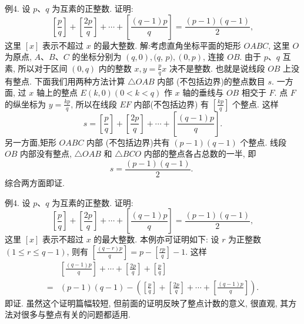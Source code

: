 例4. 设 $p 、 q$ 为互素的正整数.
证明:
$$
\left[\frac{p}{q}\right]+\left[\frac{2 p}{q}\right]+\cdots+\left[\frac{(q-1) p}{q}\right]=\frac{(p-1)(q-1)}{2},
$$
这里 $[x]$ 表示不超过 $x$ 的最大整数.
解:考虑直角坐标平面的矩形 $O A B C$, 这里 $O$ 为原点, $A 、 B 、 C$ 的坐标分别为 $(q, 0),(q$, $p),(0, p)$, 连接 $O B$. 由于 $p 、 q$ 互素, 所以对于区间 $(0, q)$ 内的整数 $x, y=\frac{p}{q} x$ 决不是整数.
也就是说线段 $O B$ 上没有整点.
下面我们用两种方法计算 $\triangle O A B$ 内部 (不包括边界)的整点数目 $s$.
一方面, 过 $x$ 轴上的整点 $E(k, 0)(0<k<q)$ 作 $x$ 轴的垂线与 $O B$ 相交于 $F$. 点 $F$ 的纵坐标为 $y=\frac{k p}{q}$, 所以在线段 $E F$ 内部(不包括边界) 有 $\left[\frac{k p}{q}\right]$ 个整点.
这样
$$
s=\left[\frac{p}{q}\right]+\left[\frac{2 p}{q}\right]+\cdots+\left[\frac{(q-1) p}{q}\right] .
$$
另一方面,矩形 $O A B C$ 内部 (不包括边界)共有 $(p-1)(q-1)$ 个整点.
线段 $O B$ 内部没有整点, $\triangle O A B$ 和 $\triangle B C O$ 内部的整点各占总数的一半, 即
$$
s=\frac{(p-1)(q-1)}{2} \text {. }
$$
综合两方面即证.



例4. 设 $p 、 q$ 为互素的正整数.
证明:
$$
\left[\frac{p}{q}\right]+\left[\frac{2 p}{q}\right]+\cdots+\left[\frac{(q-1) p}{q}\right]=\frac{(p-1)(q-1)}{2},
$$
这里 $[x]$ 表示不超过 $x$ 的最大整数.
本例亦可证明如下:
设 $r$ 为正整数 $(1 \leqslant r \leqslant q-1)$, 则有 $\left[\frac{(q-r) p}{q}\right]=p-\left[\frac{r p}{q}\right]-1$. 这样
$$
\begin{aligned}
& {\left[\frac{(q-1) p}{q}\right]+\cdots+\left[\frac{2 p}{q}\right]+\left[\frac{p}{q}\right] } \\
= & (p-1)(q-1)-\left(\left[\frac{p}{q}\right]+\left[\frac{2 p}{q}\right]+\cdots+\left[\frac{(q-1) p}{q}\right]\right) .
\end{aligned}
$$
即证.
虽然这个证明篇幅较短, 但前面的证明反映了整点计数的意义, 很直观, 其方法对很多与整点有关的问题都适用.



